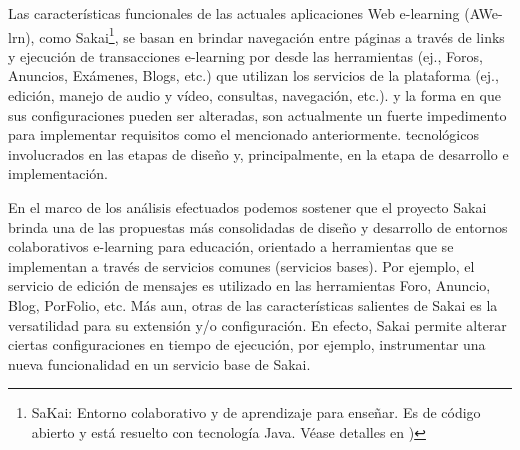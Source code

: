 
Las características funcionales de las actuales aplicaciones Web e-learning
(AWe-lrn), como Sakai\footnote{SaKai: Entorno colaborativo y de aprendizaje para
enseñar. Es de código abierto y está resuelto con tecnología Java. Véase
detalles en  )}, se basan en brindar navegación
entre páginas a través de links y ejecución de transacciones e-learning por
desde las herramientas (ej., Foros, Anuncios, Exámenes, Blogs, etc.) que
utilizan los servicios de la plataforma (ej., edición, manejo de audio y vídeo,
consultas, navegación, etc.). %
y la forma en que sus configuraciones pueden ser alteradas, son actualmente un
fuerte impedimento para implementar requisitos como el mencionado anteriormente.
tecnológicos involucrados en las etapas de diseño y, principalmente, en la etapa
de desarrollo e implementación.%

En el marco de los análisis efectuados podemos sostener que el proyecto Sakai
brinda una de las propuestas más consolidadas de diseño y desarrollo de entornos
colaborativos e-learning para educación, orientado a herramientas que se
implementan a través de servicios comunes (servicios bases). Por ejemplo, el
servicio de edición de mensajes es utilizado en las herramientas Foro, Anuncio,
Blog, PorFolio, etc. Más aun, otras de las características salientes de Sakai es
la versatilidad para su extensión y/o configuración. En efecto, Sakai permite
alterar ciertas configuraciones en tiempo de ejecución, por ejemplo,
instrumentar una nueva funcionalidad en un servicio base de Sakai. 


